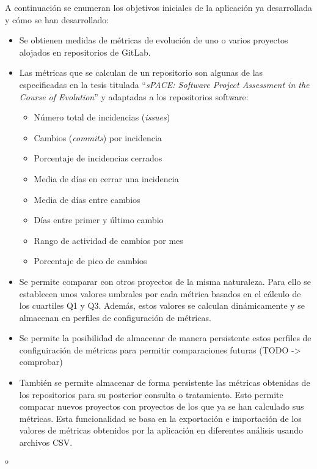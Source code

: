 A continuación se enumeran los objetivos iniciales de la aplicación ya desarrollada y cómo se han desarrollado: \cite{TFGPrevio}
\begin{itemize}
	\tightlist
	\item Se obtienen medidas de métricas de evolución de uno o varios proyectos alojados en repositorios de GitLab.
	\item Las métricas que se calculan de un repositorio  son algunas de las especificadas en la tesis titulada ``\textit{sPACE: Software Project Assessment in the Course of Evolution}'' \cite{ratzinger_space:_2007} y 
	adaptadas a los repositorios software:
	\begin{itemize}
		\tightlist
		\item Número total de incidencias (\textit{issues})
		\item Cambios (\textit{commits}) por incidencia
		\item Porcentaje de incidencias cerrados
		\item Media de días en cerrar una incidencia
		\item Media de días entre cambios
		\item Días entre primer y último cambio
		\item Rango de actividad de cambios por mes
		\item Porcentaje de pico de cambios
	\end{itemize}
	\item Se permite comparar con otros proyectos de la misma naturaleza. Para ello se establecen unos valores umbrales por cada métrica basados en el cálculo de los cuartiles Q1 y Q3. Además, estos valores se calculan dinámicamente y se almacenan en perfiles de configuración de métricas.
	\item Se permite la posibilidad de almacenar de manera persistente estos perfiles de configuiración de métricas para permitir comparaciones futuras (TODO -> comprobar)
	\item También se permite almacenar de forma persistente las métricas obtenidas de los repositorios para su posterior consulta o tratamiento. Esto permite comparar nuevos proyectos con proyectos de los que ya se han calculado sus métricas.
	 Esta funcionalidad se basa en la exportación e importación de los valores de métricas obtenidos por la aplicación en diferentes análisis usando archivos CSV.
\end{itemize}

\newpage

º
